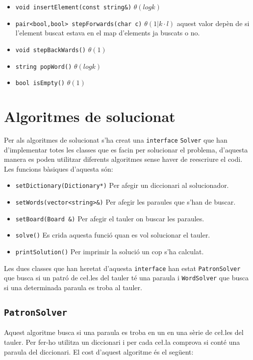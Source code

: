\documentclass{article}
\begin{document}
\begin{itemize}
	\item \verb|void insertElement(const string&)| $\theta(log k)$
	\item \verb|pair<bool,bool> stepForwards(char c)| $\theta(1 | k·l)$ aquest valor depèn de si l'element buscat estava en el map d'elements ja buscats o no.
	\item \verb|void stepBackWards()| $\theta(1)$
	\item \verb|string popWord()| $\theta(log k)$
	\item \verb|bool isEmpty()| $\theta(1)$
\end{itemize}

\section{Algoritmes de solucionat}

Per als algoritmes de solucionat s'ha creat una \verb|interface| \verb|Solver| que han d'implementar totes les classes que es facin per solucionar el problema, d'aquesta manera es poden utilitzar diferents algoritmes sense haver de reescriure el codi. Les funcions bàsiques d'aquesta són:

\begin{itemize}
	\item \verb|setDictionary(Dictionary*)| Per afegir un diccionari al solucionador.
	\item \verb|setWords(vector<string>&)| Per afegir les paraules que s'han de buscar.
	\item \verb|setBoard(Board &)| Per afegir el tauler on buscar les paraules.
	\item \verb|solve()| Es crida aquesta funció quan es vol solucionar el tauler.
	\item \verb|printSolution()| Per imprimir la solució un cop s'ha calculat.
\end{itemize}

Les dues classes que han heretat d'aquesta \verb|interface| han estat \verb|PatronSolver| que busca si un patró de ce\l.les del tauler té una paraula i \verb|WordSolver| que busca si una determinada paraula es troba al tauler.

\subsection{\texttt{PatronSolver}}
Aquest algoritme busca si una paraula es troba en un en una sèrie de ce\l.les del tauler. Per fer-ho utilitza un diccionari i per cada ce\l.la comprova si conté una paraula del diccionari. El cost d'aquest algoritme és el següent:
\end{document}

